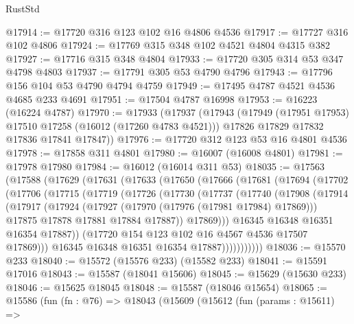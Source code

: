 \begin{lexlean}{RustStd}
\begin{coremodule}
@17914 := @17720 @316 @123 @102 @16 @4806 @4536
@17917 := @17727 @316 @102 @4806
@17924 := @17769 @315 @348 @102 @4521 @4804 @4315 @382
@17927 := @17716 @315 @348 @4804
@17933 := @17720 @305 @314 @53 @347 @4798 @4803
@17937 := @17791 @305 @53 @4790 @4796
@17943 := @17796 @156 @104 @53 @4790 @4794 @4759
@17949 := @17495 @4787 @4521 @4536 @4685 @233 @4691
@17951 := @17504 @4787 @16998
@17953 := @16223 (@16224 @4787)
@17970 := @17933
    (@17937
      (@17943
        (@17949 (@17951 @17953) @17510 @17258 (@16012 (@17260 @4783 @4521)))
        @17826
        @17829
        @17832
        @17836
        @17841
        @17847))
@17976 := @17720 @312 @123 @53 @16 @4801 @4536
@17978 := @17858 @311 @4801
@17980 := @16007 (@16008 @4801)
@17981 := @17978 @17980
@17984 := @16012 (@16014 @311 @53)
@18035 := @17563
    (@17588
      (@17629
        (@17631
          (@17633
            (@17650
              (@17666
                (@17681
                  (@17694
                    (@17702
                      (@17706
                        (@17715
                          (@17719
                            (@17726
                              (@17730
                                (@17737
                                  (@17740
                                    (@17908
                                      (@17914
                                        (@17917
                                          (@17924
                                            (@17927 (@17970 (@17976 (@17981 @17984) @17869)))
                                            @17875
                                            @17878
                                            @17881
                                            @17884
                                            @17887))
                                        @17869)))
                                  @16345
                                  @16348
                                  @16351
                                  @16354
                                  @17887))
                              (@17720 @154 @123 @102 @16 @4567 @4536 @17507 @17869)))
                          @16345
                          @16348
                          @16351
                          @16354
                          @17887)))))))))))
@18036 := @15570 @233
@18040 := @15572 (@15576 @233) (@15582 @233)
@18041 := @15591 @17016
@18043 := @15587 (@18041 @15606)
@18045 := @15629 (@15630 @233)
@18046 := @15625 @18045
@18048 := @15587 (@18046 @15654)
@18065 := @15586
    (fun (fn : @76) =>
    @18043
      (@15609
        (@15612
          (fun (params : @15611) =>

\end{coremodule}
\end{lexlean}
